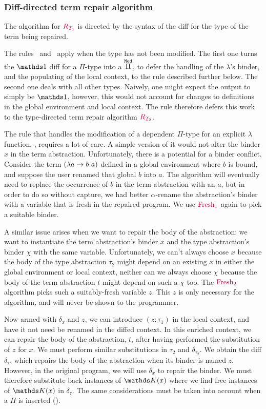 \subsubsection*{Diff-directed term repair algorithm}

The algorithm for $\textcolor{purple}{R_{T_1}}$ is directed by the syntax of the diff for
the type of the term being repaired.

The rules~ and~ apply when the type has not
been modified.  The first one turns the $\MathSame$ diff for a $\Pi$-type into a
$\overset{\mathtt{Mod}}{\Pi}$, to defer the handling of the $\lambda$'s binder, and the
populating of the local context, to the rule  described
further below.  The second one deals with all other types.  Naively, one might
expect the output to simply be $\MathSame$, however, this would not account for
changes to definitions in the global environment and local context.  The rule
therefore defers this work to the type-directed term repair algorithm
$\textcolor{purple}{R_{T_2}}$.

The rule that handles the modification of a dependent $\Pi$-type for an explicit
$\lambda$ function, , requires a lot of care.  A simple
version of it would not alter the binder $x$ in the term abstraction.
Unfortunately, there is a potential for a binder conflict.  Consider the term
$({\lambda} {a} \rightarrow b\ a)$ defined in a global environment where $b$ is bound, and
suppose the user renamed that global $b$ into $a$.  The algorithm will
eventually need to replace the occurrence of $b$ in the term abstraction with an
$a$, but in order to do so without capture, we had better $\alpha$-rename the
abstraction's binder with a variable that is fresh in the repaired program.  We
use $\textcolor{purple}{\text{Fresh}_1}$ again to pick a suitable binder.

A similar issue arises when we want to repair the body of the abstraction: we
want to instantiate the term abstraction's binder $x$ and the type abstraction's
binder $\chi$ with the same variable.  Unfortunately, we can't always choose $x$
because the body of the type abstraction $\tau_2$ might depend on an existing
$x$ in either the global environment or local context, neither can we always
choose $\chi$ because the body of the term abstraction $t$ might depend on such
a $\chi$ too.  The $\textcolor{purple}{\text{Fresh}_2}$ algorithm picks such a suitably-fresh variable
$z$.  This $z$ is only necessary for the algorithm, and will never be shown to
the programmer.

Now armed with $\delta_x$ and $z$, we can introduce $(z : \tau_1)$ in the local
context, and have it not need be renamed in the diffed context.  In this
enriched context, we can repair the body of the abstraction, $t$, after having
performed the substitution of $z$ for $x$.  We must perform similar
substitutions in $\tau_2$ and $\delta_{\tau_2}$.  We obtain the diff
$\delta_\tau$, which repairs the body of the abstraction when its binder is
named $z$.  However, in the original program, we will use $\delta_x$ to repair
the binder.  We must therefore substitute back instances of $\MathReplace{x}$
where we find free instances of $\MathReplace{x}$ in $\delta_\tau$.  The same
considerations must be taken into account when a $\Pi$ is inserted
().

